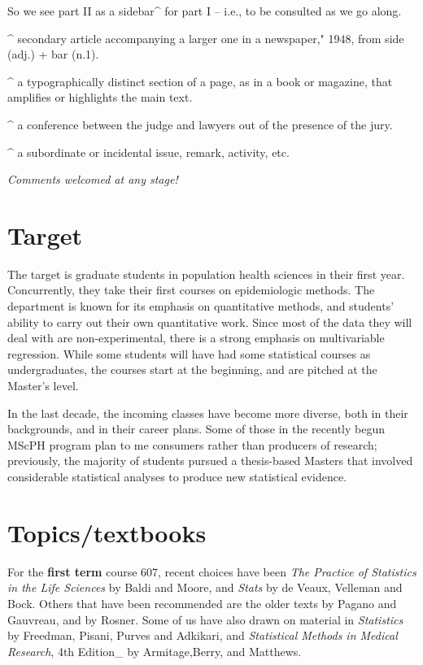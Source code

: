 \documentclass[]{book}
\begin{document}
So we see part II as a sidebar\^{} for part I -- i.e., to be consulted as we go along.

\^{} secondary article accompanying a larger one in a newspaper," 1948, from side (adj.) + bar (n.1).

\^{} a typographically distinct section of a page, as in a book or magazine, that amplifies or highlights the main text.

\^{} a conference between the judge and lawyers out of the presence of the jury.

\^{} a subordinate or incidental issue, remark, activity, etc.

\emph{Comments welcomed at any stage!}

\hypertarget{target}{%
\section{Target}\label{target}}

The target is graduate students in population health sciences in their first year. Concurrently, they take their first courses on epidemiologic methods. The department is known for its emphasis on quantitative methods, and students' ability to carry out their own quantitative work. Since most of the data they will deal with are non-experimental, there is a strong emphasis on multivariable regression. While some students will have had some statistical courses as undergraduates, the courses start at the beginning, and are pitched at the Master's level.

In the last decade, the incoming classes have become more diverse, both in their backgrounds, and in their career plans. Some of those in the recently begun MScPH program plan to me consumers rather than producers of research; previously, the majority of students pursued a thesis-based Masters that involved considerable statistical analyses to produce new statistical evidence.

\hypertarget{topicstextbooks}{%
\section{Topics/textbooks}\label{topicstextbooks}}

For the \textbf{first term} course 607, recent choices have been \emph{The Practice of Statistics in the Life Sciences} by Baldi and Moore, and \emph{Stats} by de Veaux, Velleman and Bock. Others that have been recommended are the older texts by Pagano and Gauvreau, and by Rosner. Some of us have also drawn on material in \emph{Statistics} by Freedman, Pisani, Purves and Adkikari, and
\emph{Statistical Methods in Medical Research}, 4th Edition\_ by
Armitage,Berry, and Matthews.
\end{document}
